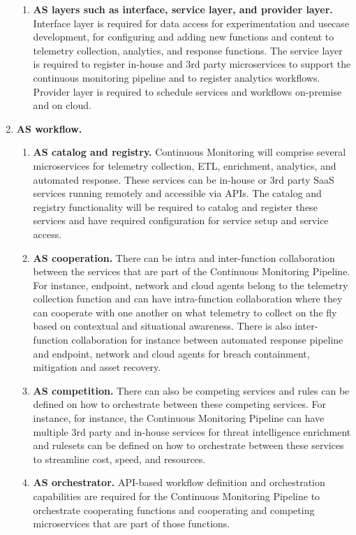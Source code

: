 \begin{enumerate}
\begin{enumerate}
  \item{\bf AS layers such as interface, service layer, and provider layer.} Interface layer is required for data access for experimentation and usecase development, for configuring and adding new functions and content to telemetry collection, analytics, and response functions. The service layer is required to register in-house and 3rd party microservices to support the continuous monitoring pipeline and to register analytics workflows. Provider layer is required to schedule services and workflows on-premise and on cloud.
  \end{enumerate}

\item{\bf AS workflow.}

  \begin{enumerate}
  
  \item{\bf AS catalog and registry.} Continuous Monitoring will comprise several microservices for telemetry collection, ETL, enrichment, analytics, and automated response. These services can be in-house or 3rd party SaaS services running remotely and accessible via APIs. The catalog and registry functionality will be required to catalog and register these services and have required configuration for service setup and service access.
  
  \item{\bf AS cooperation.} There can be intra and inter-function collaboration between the services that are part of the Continuous Monitoring Pipeline. For instance, endpoint, network and cloud agents belong to the telemetry collection function and can have intra-function collaboration where they can cooperate with one another on what telemetry to collect on the fly based on contextual and situational awareness. There is also inter-function collaboration for instance between automated response pipeline and endpoint, network and cloud agents for breach containment, mitigation and asset recovery.
  
  \item{\bf AS competition.} There can also be competing services and rules can be defined on how to orchestrate between these competing services. For instance, for instance, the Continuous Monitoring Pipeline can have multiple 3rd party and in-house services for threat intelligence enrichment and rulesets can be defined on how to orchestrate between these services to streamline cost, speed, and resources.
  
  \item{\bf AS orchestrator.} API-based workflow definition and orchestration capabilities are required for the Continuous Monitoring Pipeline to orchestrate cooperating functions and cooperating and competing microservices that are part of those functions.
  

\end{enumerate}
\end{enumerate}
